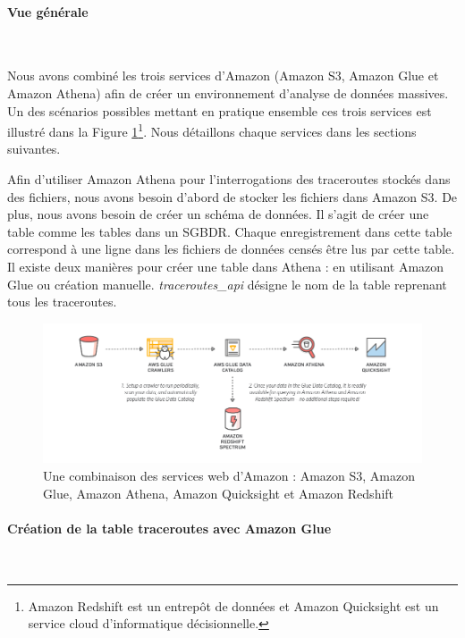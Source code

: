 \paragraph{Vue générale}~

Nous avons combiné les trois services d'Amazon (Amazon S3, Amazon Glue  et Amazon Athena)  afin de créer un environnement d'analyse de données massives. 
Un des scénarios possibles mettant en pratique ensemble ces trois services est illustré dans la Figure
\ref{fig:gluecrawler}\footnote{Amazon Redshift  est un entrepôt de données et  Amazon Quicksight  est un service cloud d'informatique décisionnelle.}. Nous détaillons chaque services dans les sections suivantes.

Afin d'utiliser Amazon Athena pour l'interrogations des traceroutes stockés dans des fichiers, nous avons besoin d'abord de stocker les fichiers dans Amazon S3. De plus, nous avons besoin de créer un  schéma de données. Il s'agit de créer une table comme les tables dans un SGBDR. Chaque enregistrement dans cette table correspond à une ligne dans les fichiers de données censés être lus par cette table. Il existe deux manières pour créer une table dans Athena : en utilisant Amazon Glue ou création manuelle. \textit{traceroutes\_api} désigne le nom de la table reprenant tous les traceroutes.

\begin{figure}[h]
	\centering
	\captionsetup{justification=centering}
	\includegraphics[width=1\linewidth]{illustrations/glue_crawler}
	\caption{Une combinaison des services web d'Amazon : Amazon S3, Amazon Glue, Amazon Athena, Amazon Quicksight  et Amazon Redshift}
	\label{fig:gluecrawler}
\end{figure}


\paragraph{Création de la table traceroutes avec Amazon Glue}~

